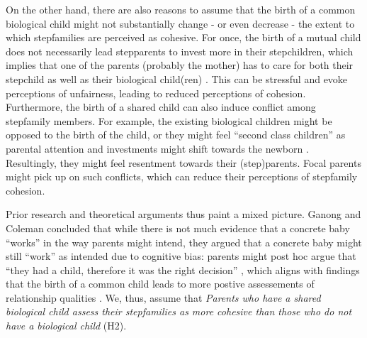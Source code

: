\documentclass[\pandocDocMode,longtable,floatsintext]{apa6}
\begin{document}
On the other hand, there are also reasons to assume that the birth of a
common biological child might not substantially change - or even
decrease - the extent to which stepfamilies are perceived as cohesive.
For once, the birth of a mutual child does not necessarily lead
stepparents to invest more in their stepchildren, which implies that one
of the parents (probably the mother) has to care for both their
stepchild as well as their biological child(ren)
\autocite{stewart2005birth}. This can be stressful and evoke perceptions
of unfairness, leading to reduced perceptions of cohesion. Furthermore,
the birth of a shared child can also induce conflict among stepfamily
members. For example, the existing biological children might be opposed
to the birth of the child, or they might feel ``second class children''
as parental attention and investments might shift towards the newborn
\autocite[ \textcite{baham2008sibling}]{sanner2018half}. Resultingly,
they might feel resentment towards their (step)parents. Focal parents
might pick up on such conflicts, which can reduce their perceptions of
stepfamily cohesion.

Prior research and theoretical arguments thus paint a mixed picture.
Ganong and Coleman concluded that while there is not much evidence that
a concrete baby ``works'' in the way parents might intend, they argued
that a concrete baby might still ``work'' as intended due to cognitive
bias: parents might post hoc argue that ``they had a child, therefore it
was the right decision'' \autocite[
\textcite{ganong1988mutual}]{ganong2017stepfamily}, which aligns with
findings that the birth of a common child leads to more postive
assessements of relationship qualities \autocite{ivanova2019cementing}.
We, thus, assume that \emph{Parents who have a shared biological child
assess their stepfamilies as more cohesive than those who do not have a
biological child} (H2).

\printbibliography[title=References]
\end{document}
